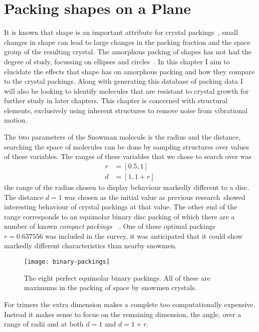 \chapter{Packing shapes on a Plane}

It is known that shape is an important attribute for crystal packings~\tocite, small changes in shape can lead to large changes in the packing fraction and the space group of the resulting crystal. The amorphous packing of shapes has not had the degree of study, focussing on ellipses and circles~\tocite. In this chapter I aim to elucidate the effects that shape has on amorphous packing and how they compare to the crystal packings. Along with generating this database of packing data I will also be looking to identify molecules that are resistant to crystal growth for further study in later chapters. This chapter is concerned with structural elements, exclusively using inherent structures to remove noise from vibrational motion.

The two parameters of the Snowman molecule is the radius and the distance, searching the space of molecules can be done by sampling structures over values of these variables. The ranges of these variables that we chose to search over was
\begin{align}
            r &= [0.5, 1] \\
            d &= [1,1+r]
\end{align}
the range of the radius chosen to display behaviour markedly different to a disc. The distance $d=1$ was chosen as the initial value as previous research~\tocite showed interesting behaviour of crystal packings at that value. The other end of the range corresponds to an equimolar binary disc packing of which there are a number of known \emph{compact packings}~~\cite{heppes:03,kennedy:06}. One of these optimal packings $r=0.637556$ was included in the survey, it was anticipated that it could show markedly different characteristics than nearby snowmen.

\begin{figure}
    \texttt{[image: binary-packings]}
    \caption[Perfect binary packings]{The eight perfect equimolar binary packings. All of these are maximums in the packing of space by snowmen crystals.}
    \label{fig:binary-packings}
\end{figure}

For trimers the extra dimension makes a complete too computationally expensive. Instead it makes sense to focus on the remaining dimension, the angle, over a range of radii and at both $d=1$ and $d=1+r$.

